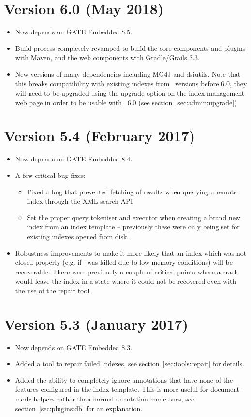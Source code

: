 \section{Version 6.0 (May 2018)}
\begin{itemize}
\item Now depends on GATE Embedded 8.5.
\item Build process completely revamped to build the core components and plugins
  with Maven, and the web components with Gradle/Grails 3.3.
\item New versions of many dependencies including MG4J and dsiutils.  Note that
  this breaks compatibility with existing indexes from \Mimir\ versions before
  6.0, they will need to be upgraded using the upgrade option on the index
  management web page in order to be usable with \Mimir\ 6.0 (see
  section~\ref{sec:admin:upgrade})
\end{itemize}

\section{Version 5.4 (February 2017)}
\begin{itemize}
\item Now depends on GATE Embedded 8.4.
\item A few critical bug fixes:
  \begin{itemize}
  \item Fixed a bug that prevented fetching of results when querying a remote
    index through the XML search API
  \item Set the proper query tokeniser and executor when creating a brand new
    index from an index template -- previously these were only being set for
    existing indexes opened from disk.
  \end{itemize}
\item Robustness improvements to make it more likely that an index which was
  not closed properly (e.g. if \Mimir\ was killed due to low memory conditions)
  will be recoverable.  There were previously a couple of critical points where
  a crash would leave the index in a state where it could not be recovered even
  with the use of the repair tool.
\end{itemize}

\section{Version 5.3 (January 2017)}
\begin{itemize}
\item Now depends on GATE Embedded 8.3.
\item Added a tool to repair failed indexes, see section~\ref{sec:tools:repair}
  for details.
\item Added the ability to completely ignore annotations that have none of the
  features configured in the index template.  This is more useful for
  document-mode helpers rather than normal annotation-mode ones, see
  section~\ref{sec:plugins:db} for an explanation.
\end{itemize}

